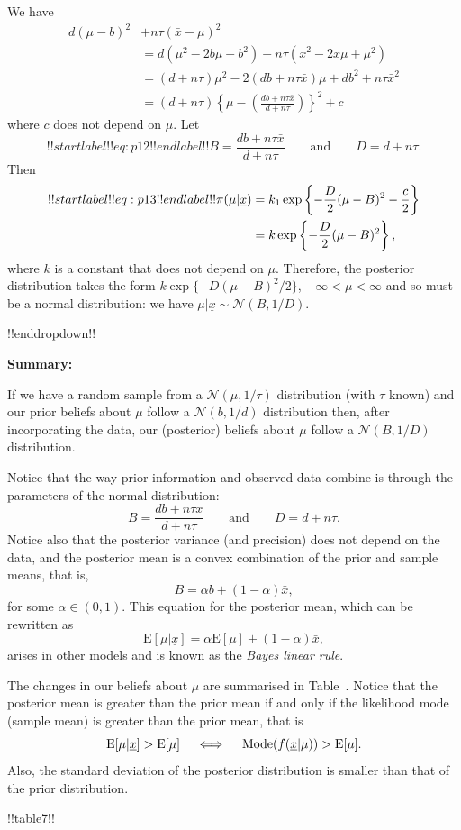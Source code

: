 {    

    
        We have
\begin{align*}
d(\mu-b)^2&+n\tau(\bar x-\mu)^2\\
&=d(\mu^2-2b\mu+b^2)+n\tau(\bar x^2-2\bar x\mu+\mu^2)\\
&=(d+n\tau)\mu^2-2(db+n\tau\bar x)\mu
+db^2+n\tau\bar x^2\\
&=(d+n\tau)\left\{\mu
-\left(\frac{db+n\tau\bar x}{d+n\tau}\right)\right\}^2+c
\end{align*}
where $c$ does not depend on $\mu$.  Let
\begin{equation}
!!startlabel!! eq:p12 !!endlabel!!
B=\frac{db+n\tau\bar x}{d+n\tau}\quad\quad\text{and}\quad\quad
D=d+n\tau.
\end{equation}
Then
\begin{align}
!!startlabel!! eq:p13 !!endlabel!!
\pi(\mu|\underline{x})&=k_1\exp\left\{-\frac{D}{2}(\mu-B)^2-\frac{c}{2}\right\}
\notag \\
&=k\exp\left\{-\frac{D}{2}(\mu-B)^2\right\},
\end{align}
where $k$ is a constant that does not depend on $\mu$. Therefore, the posterior distribution takes the form $k\exp\{-D(\mu-B)^2/2\}$, $-\infty<\mu<\infty$ and so must be a normal distribution: we have $\mu|\underline{x}\sim \mathcal{N}(B,1/D)$.

!!enddropdown!!


\textbf{Summary:}

If we have a random sample from a $\mathcal{N}(\mu,1/\tau)$ distribution (with $\tau$ known) and our prior beliefs about $\mu$ follow a $\mathcal{N}(b,1/d)$ distribution then, after incorporating the data, our (posterior) beliefs about $\mu$ follow a $\mathcal{N}(B,1/D)$ distribution.

Notice that the way prior information and observed data combine is through the parameters of the normal distribution:
\begin{equation*}
B = \frac{db+n\tau\bar x}{d+n\tau}
\quad\quad\text{and}\quad\quad 
D = d+n\tau.
\end{equation*}
Notice also that the posterior variance (and precision) does not depend on the data, and the posterior mean is a convex combination of the prior and sample means, that is,
$$
B=\alpha b+(1-\alpha)\bar x,
$$
for some $\alpha\in(0,1)$. This equation for the posterior mean, which can be rewritten as
$$
\text{E}[\mu|\underline{x}]=\alpha \text{E}[\mu]+(1-\alpha)\bar x,
$$
arises in other models and is known as the \textit{Bayes linear rule}.

The changes in our beliefs about $\mu$ are summarised in Table~.  Notice that the posterior mean is greater than the prior mean if and only if the likelihood mode (sample mean) is greater than the prior mean, that is
\begin{equation*}
\text{E}[\mu|\underline{x}] > \text{E}[\mu] \quad\iff\quad \textnormal{Mode}(f(\underline{x}|\mu))>\text{E}[\mu].
\end{equation*}
Also, the standard deviation of the posterior distribution is smaller than that of the prior distribution.



!!table7!!}



